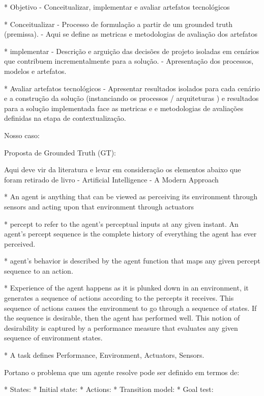 * Objetivo 
    - Conceitualizar, implementar e avaliar artefatos tecnológicos

* Conceitualizar
    - Processo de formulação a partir de um grounded truth (premissa).
    - Aqui se define as metricas e metodologias de avaliação dos artefatos

* implementar
    - Descrição e arguição das decisões de projeto isoladas em cenários que contribuem incrementalmente para a solução.
    - Apresentação dos processos, modelos e artefatos.

* Avaliar artefatos tecnológicos
    -  Apresentar resultados isolados para cada cenário e a construção da solução (instanciando os processos / arquiteturas ) e resultados para a solução implementada face as metricas e e metodologias de avaliações definidas na etapa de contextualização.





Nosso caso: 

Proposta de Grounded Truth (GT): 

Aqui deve vir da literatura e levar em consideração os elementos abaixo que foram retirado de livro - Artificial Intelligence - A Modern Approach

* An agent is anything that can be viewed as perceiving its environment through sensors and
acting upon that environment through actuators

* percept to refer to the agent’s perceptual inputs at any given instant. An
agent’s percept sequence is the complete history of everything the agent has ever perceived.

* agent’s behavior is described by the agent function that maps any given percept sequence to an action.

* Experience of the agent happens as it is plunked down in an environment, it generates a sequence of actions according to the percepts it receives. This sequence of actions causes the environment to go through a sequence of states. If the sequence is desirable, then the agent has performed well. This notion of desirability is captured by a performance measure that evaluates any given sequence of environment states.

* A task defines Performance, Environment, Actuators, Sensors.

Portano o problema que um agente resolve pode ser definido em termos de:

* States: 
* Initial state: 
* Actions: 
* Transition model: 
* Goal test: 


